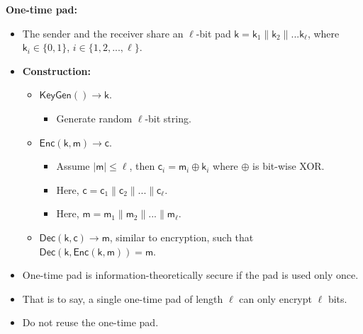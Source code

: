 \documentclass{article}
\newcommand{\msf}[1]{\mathsf{#1}}
\newcommand{\parhead}[1]{\noindent \textbf{#1}}
\begin{document}
\parhead{One-time pad:}
\begin{itemize}
    \item The sender and the receiver share an $\ell$-bit pad $\msf{k}=\msf{k}_1\parallel \msf{k}_2\parallel... \msf{k}_\ell$, where $\msf{k}_i\in\{0,1\}$, $i\in\{1,2,...,\ell\}$.
    
    \item {\bf Construction:}
    \begin{itemize}
        \item $\msf{KeyGen}()\rightarrow\msf{k}$.
        \begin{itemize}
            \item Generate random $\ell$-bit string.
        \end{itemize}
        
        \item $\msf{Enc}(\msf{k},\msf{m})\rightarrow\msf{c}$.
        \begin{itemize}
            \item Assume $|\msf{m}|\leq\ell$, then $\msf{c}_i=\msf{m}_i\oplus \msf{k}_i$ where $\oplus$ is bit-wise XOR.
            
            \item Here, $\msf{c}=\msf{c}_1\parallel \msf{c}_2\parallel...\parallel \msf{c}_\ell$.
            
            \item Here, $\msf{m}=\msf{m}_1\parallel \msf{m}_2\parallel...\parallel \msf{m}_\ell$.
        \end{itemize}
        
        \item $\msf{Dec}(\msf{k},\msf{c})\rightarrow\msf{m}$, similar to encryption, such that    $\msf{Dec}(\msf{k},\msf{Enc}(\msf{k},\msf{m}))=\msf{m}$.
    \end{itemize}
    
    \item One-time pad is information-theoretically secure if the pad is used only once.
    
    \item That is to say, a single one-time pad of length $\ell$ can only encrypt $\ell$ bits.
    
    \item Do not reuse the one-time pad.
\end{itemize}
\end{document}
